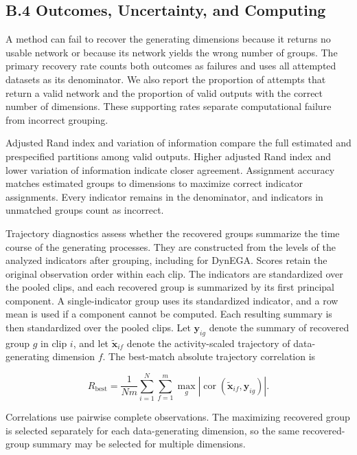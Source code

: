 \documentclass[
]{article}
\begin{document}
\subsection{B.4 Outcomes, Uncertainty, and
Computing}\label{b.4-outcomes-uncertainty-and-computing}

A method can fail to recover the generating dimensions because it
returns no usable network or because its network yields the wrong number
of groups. The primary recovery rate counts both outcomes as failures
and uses all attempted datasets as its denominator. We also report the
proportion of attempts that return a valid network and the proportion of
valid outputs with the correct number of dimensions. These supporting
rates separate computational failure from incorrect grouping.

Adjusted Rand index and variation of information compare the full
estimated and prespecified partitions among valid outputs. Higher
adjusted Rand index and lower variation of information indicate closer
agreement. Assignment accuracy matches estimated groups to dimensions to
maximize correct indicator assignments. Every indicator remains in the
denominator, and indicators in unmatched groups count as incorrect.

Trajectory diagnostics assess whether the recovered groups summarize the
time course of the generating processes. They are constructed from the
levels of the analyzed indicators after grouping, including for DynEGA.
Scores retain the original observation order within each clip. The
indicators are standardized over the pooled clips, and each recovered
group is summarized by its first principal component. A single-indicator
group uses its standardized indicator, and a row mean is used if a
component cannot be computed. Each resulting summary is then
standardized over the pooled clips. Let \(\mathbf y_{ig}\) denote the
summary of recovered group \(g\) in clip \(i\), and let
\(\tilde{\mathbf x}_{if}\) denote the activity-scaled trajectory of
data-generating dimension \(f\). The best-match absolute trajectory
correlation is

\[
R_{\mathrm{best}}
=
\frac{1}{Nm}
\sum_{i=1}^{N}\sum_{f=1}^{m}
\max_g
\left|
\operatorname{cor}
\left(\tilde{\mathbf x}_{if},\mathbf y_{ig}\right)
\right|.
\]

Correlations use pairwise complete observations. The maximizing
recovered group is selected separately for each data-generating
dimension, so the same recovered-group summary may be selected for
multiple dimensions.
\end{document}
